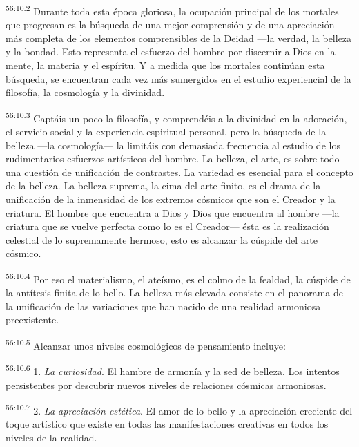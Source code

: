 \par
\textsuperscript{56:10.2} Durante toda esta época gloriosa, la ocupación principal de los mortales que progresan es la búsqueda de una mejor comprensión y de una apreciación más completa de los elementos comprensibles de la Deidad ---la verdad, la belleza y la bondad. Esto representa el esfuerzo del hombre por discernir a Dios en la mente, la materia y el espíritu. Y a medida que los mortales continúan esta búsqueda, se encuentran cada vez más sumergidos en el estudio experiencial de la filosofía, la cosmología y la divinidad.

\par
\textsuperscript{56:10.3} Captáis un poco la filosofía, y comprendéis a la divinidad en la adoración, el servicio social y la experiencia espiritual personal, pero la búsqueda de la belleza ---la cosmología--- la limitáis con demasiada frecuencia al estudio de los rudimentarios esfuerzos artísticos del hombre. La belleza, el arte, es sobre todo una cuestión de unificación de contrastes. La variedad es esencial para el concepto de la belleza. La belleza suprema, la cima del arte finito, es el drama de la unificación de la inmensidad de los extremos cósmicos que son el Creador y la criatura. El hombre que encuentra a Dios y Dios que encuentra al hombre ---la criatura que se vuelve perfecta como lo es el Creador--- ésta es la realización celestial de lo supremamente hermoso, esto es alcanzar la cúspide del arte cósmico.

\par
\textsuperscript{56:10.4} Por eso el materialismo, el ateísmo, es el colmo de la fealdad, la cúspide de la antítesis finita de lo bello. La belleza más elevada consiste en el panorama de la unificación de las variaciones que han nacido de una realidad armoniosa preexistente.

\par
\textsuperscript{56:10.5} Alcanzar unos niveles cosmológicos de pensamiento incluye:

\par
\textsuperscript{56:10.6} 1. \textit{La curiosidad}. El hambre de armonía y la sed de belleza. Los intentos persistentes por descubrir nuevos niveles de relaciones cósmicas armoniosas.

\par
\textsuperscript{56:10.7} 2. \textit{La apreciación estética}. El amor de lo bello y la apreciación creciente del toque artístico que existe en todas las manifestaciones creativas en todos los niveles de la realidad.

